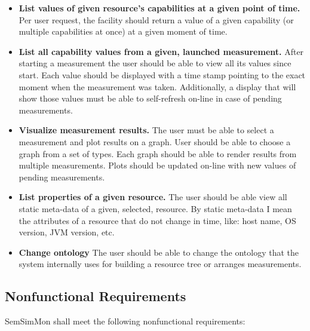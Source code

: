 \begin{itemize}
\item {\bf List values of given resource's capabilities at a given point of time.}
Per user request, the facility should return a value of a given capability (or multiple capabilities at once) at a given moment of time.

\item {\bf List all capability values from a given, launched measurement.}
After starting a measurement the user should be able to view all its values since start. Each value should be displayed with a time stamp pointing to the exact moment when the measurement was taken. Additionally, a display that will show those values must be able to self-refresh on-line in case of pending measurements.

\item {\bf Visualize measurement results.}
The user must be able to select a measurement and plot results on a graph. User should be able to choose a graph from a set of types. Each graph should be able to render results from multiple measurements. Plots should be updated on-line with new values of pending measurements.

\item {\bf List properties of a given resource.}
The user should be able view all static meta-data of a given, selected, resource. By static meta-data I mean the attributes of a resource that do not change in time, like: host name, OS version, JVM version, etc.

\item {\bf Change ontology}
The user should be able to change the ontology that the system internally uses for building a resource tree or arranges measurements.

\end{itemize}

\subsection{Nonfunctional Requirements}
\label{subsec:NonFunctionalRequirements}

SemSimMon shall meet the following nonfunctional requirements:

